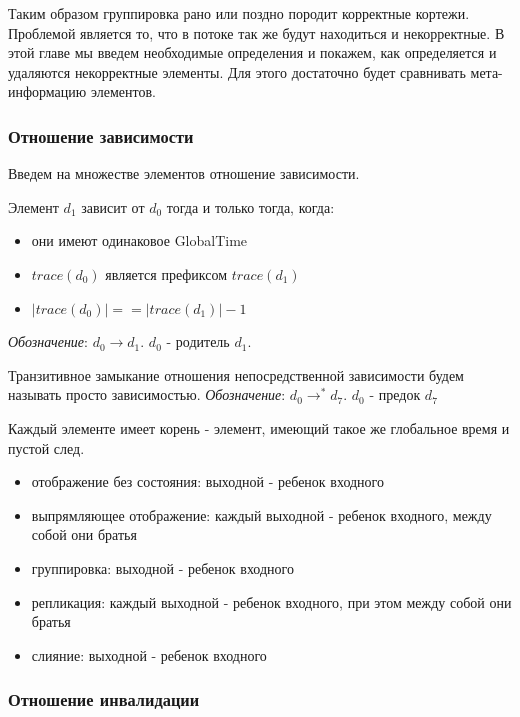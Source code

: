 \documentclass[14pt]{matmex-diploma-custom}
\begin{document}
Таким образом группировка рано или поздно породит корректные кортежи. Проблемой является то, что в потоке так же будут находиться и некорректные. В этой главе мы введем необходимые определения и покажем, как определяется и удаляются некорректные элементы. Для этого достаточно будет сравнивать мета-информацию элементов.

\subsubsection{Отношение зависимости}

Введем на множестве элементов отношение зависимости.

Элемент \(d_1\) зависит от \(d_0\) тогда и только тогда, когда:

\begin{itemize}
  \item они имеют одинаковое GlobalTime
  \item \(trace(d_0)\) является префиксом \(trace(d_1)\)
  \item \(|trace(d_0)| == |trace(d_1)| - 1\)
\end{itemize}

\textit{Обозначение}: \(d_0 \rightarrow d_1\). \(d_0\) - родитель \(d_1\).

Транзитивное замыкание отношения непосредственной зависимости будем называть просто зависимостью. \textit{Обозначение}: \(d_0 \rightarrow^* d_7\). \(d_0\) - предок \(d_7\)

Каждый элементе имеет корень - элемент, имеющий такое же глобальное время и пустой след.

\begin{itemize}
  \item отображение без состояния: выходной - ребенок входного
  \item выпрямляющее отображение: каждый выходной - ребенок входного, между собой они братья
  \item группировка: выходной - ребенок входного
  \item репликация: каждый выходной - ребенок входного, при этом между собой они братья
  \item слияние: выходной - ребенок входного
\end{itemize}

\subsubsection{Отношение инвалидации}
\end{document}
